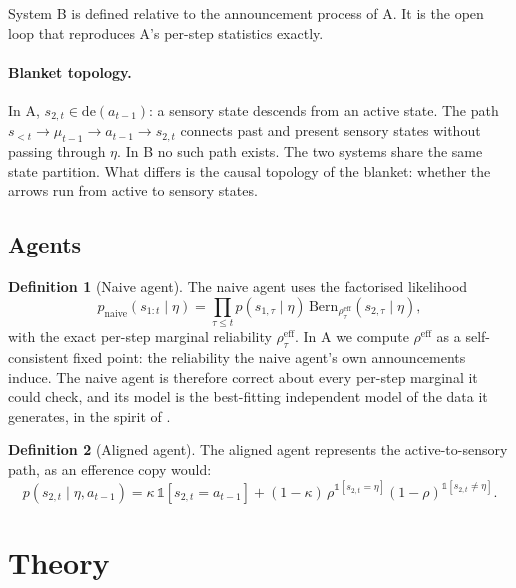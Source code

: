 \documentclass[11pt]{article}
\theoremstyle{definition}
\newtheorem{definition}{Definition}
\theoremstyle{remark}
\newcommand{\de}{\mathrm{de}}
\newcommand{\reff}{\rho^{\mathrm{eff}}}
\begin{document}
System B is defined relative to the announcement process of A. It is the open
loop that reproduces A's per-step statistics exactly.

\paragraph{Blanket topology.} In A, $s_{2,t}\in\de(a_{t-1})$: a sensory state
descends from an active state. The path
$s_{<t}\to\mu_{t-1}\to a_{t-1}\to s_{2,t}$ connects past and present sensory
states without passing through $\eta$. In B no such path exists. The two systems
share the same state partition. What differs is the causal topology of the
blanket: whether the arrows run from active to sensory states.

\subsection{Agents}

\begin{definition}[Naive agent]
The naive agent uses the factorised likelihood
\begin{equation}
p_{\text{naive}}(s_{1:t}\mid\eta)=\prod_{\tau\le t}p(s_{1,\tau}\mid\eta)\,
\mathrm{Bern}_{\reff_\tau}(s_{2,\tau}\mid\eta),
\end{equation}
with the exact per-step marginal reliability $\reff_\tau$. In A we compute
$\reff$ as a self-consistent fixed point: the reliability the naive agent's own
announcements induce. The naive agent is therefore correct about every per-step
marginal it could check, and its model is the best-fitting independent model of
the data it generates, in the spirit of \citep{esponda2016}.
\end{definition}

\begin{definition}[Aligned agent]
The aligned agent represents the active-to-sensory path, as an efference copy
would:
\begin{equation}
p(s_{2,t}\mid\eta,a_{t-1})=\kappa\,\mathbb{1}[s_{2,t}=a_{t-1}]+(1-\kappa)\,
\rho^{\mathbb{1}[s_{2,t}=\eta]}(1-\rho)^{\mathbb{1}[s_{2,t}\neq\eta]}.
\label{eq:aligned}
\end{equation}
\end{definition}

\section{Theory}\label{sec:theory}
\end{document}
